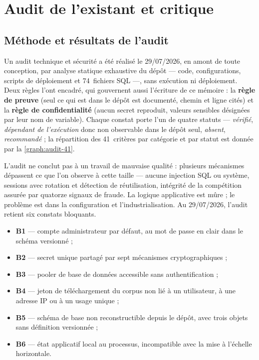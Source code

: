 \section{Audit de l'existant et critique}
\label{sec:critique-existant}

\subsection{Méthode et résultats de l'audit}
\label{subsec:methode-audit}
\label{subsec:resultats-audit}

Un audit technique et sécurité a été réalisé le 29/07/2026, en amont de toute conception,
par analyse statique exhaustive du dépôt --- code, configurations, scripts de déploiement et
74~fichiers SQL ---, sans exécution ni déploiement. Deux règles l'ont encadré, qui gouvernent
aussi l'écriture de ce mémoire : la \textbf{règle de preuve} (seul ce qui est dans le dépôt est
documenté, chemin et ligne cités) et la \textbf{règle de confidentialité} (aucun secret
reproduit, valeurs sensibles désignées par leur nom de variable). Chaque constat
porte l'un de quatre statuts --- \emph{vérifié}, \emph{dépendant de l'exécution} donc non
observable dans le dépôt seul, \emph{absent}, \emph{recommandé} ; la répartition des
41~critères par catégorie et par statut est donnée par la \cref{graph:audit-41}.

L'audit ne conclut pas à un travail de mauvaise qualité : plusieurs mécanismes dépassent ce que
l'on observe à cette taille --- aucune injection SQL ou système, sessions avec rotation et
détection de réutilisation, intégrité de la compétition assurée par quatorze signaux de fraude.
La logique applicative est mûre ; le problème est dans la configuration et l'industrialisation.
Au 29/07/2026, l'audit retient six constats bloquants.

\begin{itemize}\setlength{\itemsep}{1pt}
  \item \textbf{B1} --- compte administrateur par défaut, au mot de passe en clair dans le schéma versionné ;
  \item \textbf{B2} --- secret unique partagé par sept mécanismes cryptographiques ;
  \item \textbf{B3} --- pooler de base de données accessible sans authentification ;
  \item \textbf{B4} --- jeton de téléchargement du corpus non lié à un utilisateur, à une adresse IP ou à un usage unique ;
  \item \textbf{B5} --- schéma de base non reconstructible depuis le dépôt, avec trois objets sans définition versionnée ;
  \item \textbf{B6} --- état applicatif local au processus, incompatible avec la mise à l'échelle horizontale.
\end{itemize}

